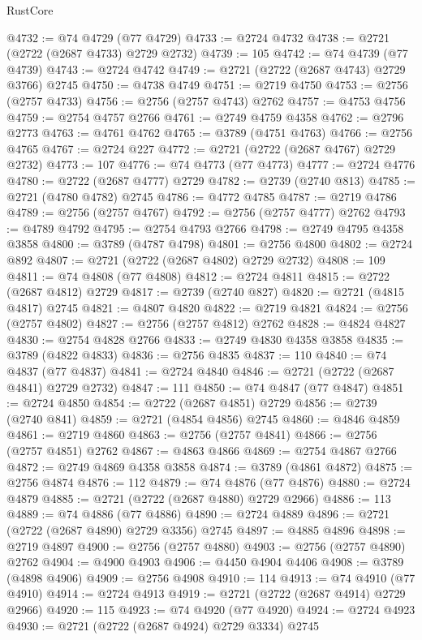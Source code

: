 \begin{lexlean}{RustCore}
\begin{coremodule}
@4732 := @74 @4729 (@77 @4729)
@4733 := @2724 @4732
@4738 := @2721 (@2722 (@2687 @4733) @2729 @2732)
@4739 := 105
@4742 := @74 @4739 (@77 @4739)
@4743 := @2724 @4742
@4749 := @2721 (@2722 (@2687 @4743) @2729 @3766) @2745
@4750 := @4738 @4749
@4751 := @2719 @4750
@4753 := @2756 (@2757 @4733)
@4756 := @2756 (@2757 @4743) @2762
@4757 := @4753 @4756
@4759 := @2754 @4757 @2766
@4761 := @2749 @4759 @4358
@4762 := @2796 @2773
@4763 := @4761 @4762
@4765 := @3789 (@4751 @4763)
@4766 := @2756 @4765
@4767 := @2724 @227
@4772 := @2721 (@2722 (@2687 @4767) @2729 @2732)
@4773 := 107
@4776 := @74 @4773 (@77 @4773)
@4777 := @2724 @4776
@4780 := @2722 (@2687 @4777) @2729
@4782 := @2739 (@2740 @813)
@4785 := @2721 (@4780 @4782) @2745
@4786 := @4772 @4785
@4787 := @2719 @4786
@4789 := @2756 (@2757 @4767)
@4792 := @2756 (@2757 @4777) @2762
@4793 := @4789 @4792
@4795 := @2754 @4793 @2766
@4798 := @2749 @4795 @4358 @3858
@4800 := @3789 (@4787 @4798)
@4801 := @2756 @4800
@4802 := @2724 @892
@4807 := @2721 (@2722 (@2687 @4802) @2729 @2732)
@4808 := 109
@4811 := @74 @4808 (@77 @4808)
@4812 := @2724 @4811
@4815 := @2722 (@2687 @4812) @2729
@4817 := @2739 (@2740 @827)
@4820 := @2721 (@4815 @4817) @2745
@4821 := @4807 @4820
@4822 := @2719 @4821
@4824 := @2756 (@2757 @4802)
@4827 := @2756 (@2757 @4812) @2762
@4828 := @4824 @4827
@4830 := @2754 @4828 @2766
@4833 := @2749 @4830 @4358 @3858
@4835 := @3789 (@4822 @4833)
@4836 := @2756 @4835
@4837 := 110
@4840 := @74 @4837 (@77 @4837)
@4841 := @2724 @4840
@4846 := @2721 (@2722 (@2687 @4841) @2729 @2732)
@4847 := 111
@4850 := @74 @4847 (@77 @4847)
@4851 := @2724 @4850
@4854 := @2722 (@2687 @4851) @2729
@4856 := @2739 (@2740 @841)
@4859 := @2721 (@4854 @4856) @2745
@4860 := @4846 @4859
@4861 := @2719 @4860
@4863 := @2756 (@2757 @4841)
@4866 := @2756 (@2757 @4851) @2762
@4867 := @4863 @4866
@4869 := @2754 @4867 @2766
@4872 := @2749 @4869 @4358 @3858
@4874 := @3789 (@4861 @4872)
@4875 := @2756 @4874
@4876 := 112
@4879 := @74 @4876 (@77 @4876)
@4880 := @2724 @4879
@4885 := @2721 (@2722 (@2687 @4880) @2729 @2966)
@4886 := 113
@4889 := @74 @4886 (@77 @4886)
@4890 := @2724 @4889
@4896 := @2721 (@2722 (@2687 @4890) @2729 @3356) @2745
@4897 := @4885 @4896
@4898 := @2719 @4897
@4900 := @2756 (@2757 @4880)
@4903 := @2756 (@2757 @4890) @2762
@4904 := @4900 @4903
@4906 := @4450 @4904 @4406
@4908 := @3789 (@4898 @4906)
@4909 := @2756 @4908
@4910 := 114
@4913 := @74 @4910 (@77 @4910)
@4914 := @2724 @4913
@4919 := @2721 (@2722 (@2687 @4914) @2729 @2966)
@4920 := 115
@4923 := @74 @4920 (@77 @4920)
@4924 := @2724 @4923
@4930 := @2721 (@2722 (@2687 @4924) @2729 @3334) @2745

\end{coremodule}
\end{lexlean}
